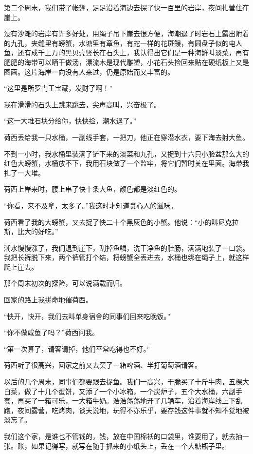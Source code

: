 \par 第二个周末，我们带了帐篷，足足沿着海边去探了快一百里的岩岸，夜间扎营住在崖上。
\par 没有沙滩的岩岸有许多好处，用绳子吊下崖去很方便，海潮退了时岩石上露出附着的九孔，夹缝里有螃蟹，水塘里有章鱼，有蛇一样的花斑鳗，有圆盘子似的电人鱼，还有成千上万的黑贝壳竖长在石头上，我认得出它们是一种海鲜叫淡菜，再有肥肥的海带可以晒干做汤，漂流木是现代雕塑，小花石头捡回来贴在硬纸板上又是图画。这片海岸一向没有人来过，仍是原始而又丰富的。
\par “这里是所罗门王宝藏，发财了啊！”
\par 我在滑滑的石头上跳来跳去，尖声高叫，兴奋极了。
\par “这一大堆石块分给你，快快捡，潮水退了。”
\par 荷西丢给我一只水桶，一副线手套，一把刀，他正在穿潜水衣，要下海去射大鱼。
\par 不到一小时，我水桶里装满了铲下来的淡菜和九孔，又捉到十六只小脸盆那么大的红色大螃蟹，水桶放不下，我用石块做了一个监牢，将它们暂时关在里面。海带我扎了一大堆。
\par 荷西上岸来时，腰上串了快十条大鱼，颜色都是淡红色的。
\par “你看，来不及拿，太多了。”我这时才知道贪心人的滋味。
\par 荷西看了我的大螃蟹，又去捉了快二十个黑灰色的小蟹。他说：“小的叫尼克拉斯，比大的好吃。”
\par 潮水慢慢涨了，我们退到崖下，刮掉鱼鳞，洗干净鱼的肚肠，满满地装了一口袋。我把长裤脱下来，两个裤管打个结，将螃蟹全丢进去，水桶也绑在绳子上，就这样爬上崖去。
\par 那个周末初次的探险，可以说满载而归。
\par 回家的路上我拼命地催荷西。
\par “快开，快开，我们去叫单身宿舍的同事们回来吃晚饭。”
\par “你不做咸鱼了吗？”荷西问我。
\par “第一次算了，请客请掉，他们平常吃得也不好。”
\par 荷西听了很高兴，回家之前又去买了一箱啤酒、半打葡萄酒请客。
\par 以后的几个周末，同事们都要跟去捉鱼。我们一高兴，干脆买了十斤牛肉，五棵大白菜，做了十几个蛋饼，又添了一个小冰箱，一个炭炉子，五个大水桶，六副手套，再买了一箱可乐，一大箱牛奶。浩浩荡荡地开了几辆车，沿着海岸线上下乱跑，夜间露营，吃烤肉，谈天说地，玩得不亦乐乎，要存钱这件事就不知不觉地被淡忘了。
\par 我们这个家，是谁也不管钱的，钱，放在中国棉袄的口袋里，谁要用了，就去抽一张。账，如果记得写，就写在随手抓来的小纸头上，丢在一个大糖瓶子里。
